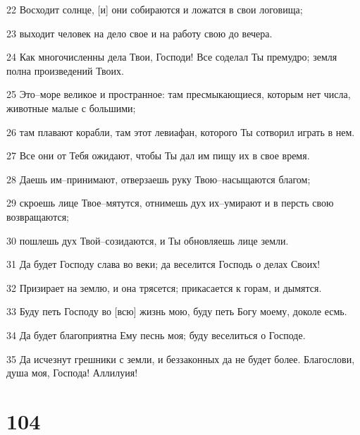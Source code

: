 \par 22 Восходит солнце, [и] они собираются и ложатся в свои логовища;
\par 23 выходит человек на дело свое и на работу свою до вечера.
\par 24 Как многочисленны дела Твои, Господи! Все соделал Ты премудро; земля полна произведений Твоих.
\par 25 Это--море великое и пространное: там пресмыкающиеся, которым нет числа, животные малые с большими;
\par 26 там плавают корабли, там этот левиафан, которого Ты сотворил играть в нем.
\par 27 Все они от Тебя ожидают, чтобы Ты дал им пищу их в свое время.
\par 28 Даешь им--принимают, отверзаешь руку Твою--насыщаются благом;
\par 29 скроешь лице Твое--мятутся, отнимешь дух их--умирают и в персть свою возвращаются;
\par 30 пошлешь дух Твой--созидаются, и Ты обновляешь лице земли.
\par 31 Да будет Господу слава во веки; да веселится Господь о делах Своих!
\par 32 Призирает на землю, и она трясется; прикасается к горам, и дымятся.
\par 33 Буду петь Господу во [всю] жизнь мою, буду петь Богу моему, доколе есмь.
\par 34 Да будет благоприятна Ему песнь моя; буду веселиться о Господе.
\par 35 Да исчезнут грешники с земли, и беззаконных да не будет более. Благослови, душа моя, Господа! Аллилуия!

\chapter{104}

